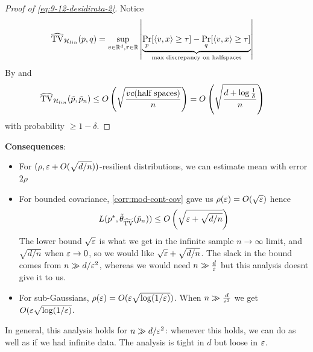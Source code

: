 \begin{proof}[Proof of \cref{eq:9-12-desidirata-2}]
    Notice
    \begin{align}
        \widehat{\operatorname{TV}}_{\mathcal{H}_{lin}}(p,q)
        &= \sup_{v \in \mathbb{R}^d, \tau \in \mathbb{R}} \left\lvert
            \underbrace{\Pr_p[\braket{v,x} \geq \tau] - \Pr_q[\braket{v,x} \geq \tau]}_{\text{max discrepancy on halfspaces}}
        \right\rvert
    \end{align}
    By  and 
    \begin{align}
        \widehat{\operatorname{TV}}_{\mathcal{H}_{lin}}(\tilde{p}, \tilde{p}_n)
        &\leq O\left(\sqrt{\frac{vc(\text{half spaces})}{n}}\right)
        = O\left(\sqrt{\frac{d + \log \frac{1}{\delta}}{n}}\right)
    \end{align}
    with probability $\geq 1 - \delta$.
\end{proof}

\textbf{Consequences}:
\begin{itemize}
    \item For $(\rho, \varepsilon + O(\sqrt{d/n}))$-resilient distributions, we can estimate mean with error $2 \rho$
    \item For bounded covariance, \cref{corr:mod-cont-cov} gave us
        $\rho(\varepsilon) = O(\sqrt{\varepsilon})$ hence
    \begin{align}
        L(p^*, \tilde{\theta}_{\widetilde{\operatorname{TV}}}(\tilde{p}_n))
        \leq O\left(\sqrt{\varepsilon + \sqrt{d/n}}\right)
    \end{align}
    The lower bound $\sqrt{\varepsilon}$ is what we get in the infinite sample $n \to \infty$
    limit, and $\sqrt{d/n}$ when $\varepsilon \to 0$, so we would like $\sqrt{\varepsilon} + \sqrt{d/n}$.
    The slack in the bound comes from $n \gg d / \varepsilon^2$, whereas we would need $n \gg \frac{d}{\varepsilon}$ but this analysis doesnt give it to us.

    \item For sub-Gaussians, $\rho(\varepsilon) = O(\varepsilon \sqrt{\log(1/\varepsilon)})$.
    When $n \gg \frac{d}{\varepsilon^2}$ we get $O(\varepsilon \sqrt{\log (1/\varepsilon)}$.
\end{itemize}
In general, this analysis holds for $n \gg d / \varepsilon^2$: whenever this holds, we can
do as well as if we had infinite data. The analysis is tight in $d$ but loose in $\varepsilon$.

